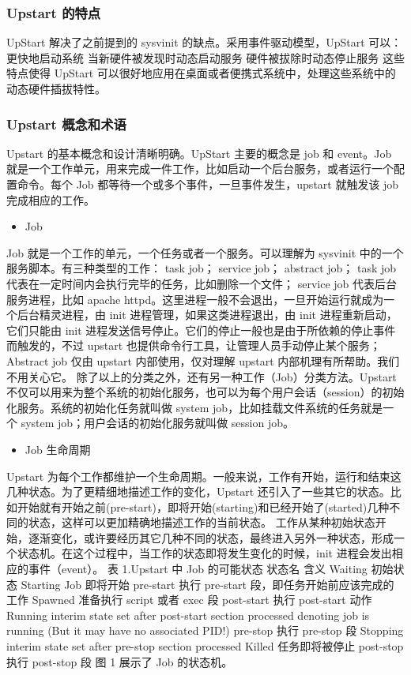 \documentclass[a4paper,10pt,english]{sphinxmanual}
\begin{document}
\subsubsection{Upstart 的特点}
\label{\detokenize{linux/point:id1}}
UpStart 解决了之前提到的 sysvinit 的缺点。采用事件驱动模型，UpStart 可以：
更快地启动系统
当新硬件被发现时动态启动服务
硬件被拔除时动态停止服务
这些特点使得 UpStart 可以很好地应用在桌面或者便携式系统中，处理这些系统中的动态硬件插拔特性。


\subsubsection{Upstart 概念和术语}
\label{\detokenize{linux/point:id2}}
Upstart 的基本概念和设计清晰明确。UpStart 主要的概念是 job 和 event。Job 就是一个工作单元，用来完成一件工作，比如启动一个后台服务，或者运行一个配置命令。每个 Job 都等待一个或多个事件，一旦事件发生，upstart 就触发该 job 完成相应的工作。
\begin{itemize}
\item {} 
Job

\end{itemize}

Job 就是一个工作的单元，一个任务或者一个服务。可以理解为 sysvinit 中的一个服务脚本。有三种类型的工作：
task job；
service job；
abstract job；
task job 代表在一定时间内会执行完毕的任务，比如删除一个文件；
service job 代表后台服务进程，比如 apache httpd。这里进程一般不会退出，一旦开始运行就成为一个后台精灵进程，由 init 进程管理，如果这类进程退出，由 init 进程重新启动，它们只能由 init 进程发送信号停止。它们的停止一般也是由于所依赖的停止事件而触发的，不过 upstart 也提供命令行工具，让管理人员手动停止某个服务；
Abstract job 仅由 upstart 内部使用，仅对理解 upstart 内部机理有所帮助。我们不用关心它。
除了以上的分类之外，还有另一种工作（Job）分类方法。Upstart 不仅可以用来为整个系统的初始化服务，也可以为每个用户会话（session）的初始化服务。系统的初始化任务就叫做 system job，比如挂载文件系统的任务就是一个 system job；用户会话的初始化服务就叫做 session job。
\begin{itemize}
\item {} 
Job 生命周期

\end{itemize}

Upstart 为每个工作都维护一个生命周期。一般来说，工作有开始，运行和结束这几种状态。为了更精细地描述工作的变化，Upstart 还引入了一些其它的状态。比如开始就有开始之前(pre-start)，即将开始(starting)和已经开始了(started)几种不同的状态，这样可以更加精确地描述工作的当前状态。
工作从某种初始状态开始，逐渐变化，或许要经历其它几种不同的状态，最终进入另外一种状态，形成一个状态机。在这个过程中，当工作的状态即将发生变化的时候，init 进程会发出相应的事件（event）。
表 1.Upstart 中 Job 的可能状态
状态名 含义
Waiting 初始状态
Starting    Job 即将开始
pre-start   执行 pre-start 段，即任务开始前应该完成的工作
Spawned 准备执行 script 或者 exec 段
post-start  执行 post-start 动作
Running interim state set after post-start section processed denoting job is running (But it may have no associated PID!)
pre-stop    执行 pre-stop 段
Stopping    interim state set after pre-stop section processed
Killed  任务即将被停止
post-stop   执行 post-stop 段
图 1 展示了 Job 的状态机。
\end{document}
